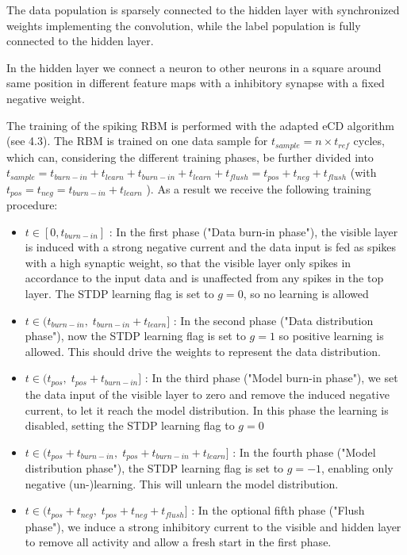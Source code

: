 The data population is sparsely connected to the hidden layer with synchronized weights implementing the convolution, while the label population is fully connected to the hidden layer.

In the hidden layer we connect a neuron to other neurons in a square around same position in different feature maps with a inhibitory synapse with a fixed negative weight.

The training of the spiking RBM is performed with the adapted eCD algorithm (see 4.3).
The RBM is trained on one data sample for $t_{sample} = n \times t_{ref}$ cycles, which can, considering the different training phases, be further divided into $t_{sample} = t_{burn-in} + t_{learn} + t_{burn-in} + t_{learn} + t_{flush} = t_{pos} + t_{neg} + t_{flush}$ (with $t_{pos} = t_{neg} = t_{burn-in} + t_{learn}$ ). 
As a result we receive the following training procedure:
\begin{itemize}

\item $t \in [0, t_{burn-in}]$ : In the first phase ("Data burn-in phase"), the visible layer is induced with a strong negative current and the data input is fed as spikes with a high synaptic weight, so that the visible layer only spikes in accordance to the input data and is unaffected from any spikes in the top layer.
The STDP learning flag is set to $g=0$, so no learning is allowed

\item $t \in (t_{burn-in} , \; t_{burn-in} + t_{learn}]$ : In the second phase ("Data distribution phase"), now the STDP learning flag is set to $g=1$ so positive learning is allowed.
This should drive the weights to represent the data distribution.

\item $t \in (t_{pos}, \;  t_{pos} + t_{burn-in}]$ : In the third phase ("Model burn-in phase"), we set the data input of the visible layer to zero and remove the induced negative current, to let it reach the model distribution.
In this phase the learning is disabled, setting the STDP learning flag to $g=0$

\item $t \in (t_{pos} + t_{burn-in}, \;  t_{pos} + t_{burn-in} + t_{learn}]$ : In the fourth phase ("Model distribution phase"), the STDP learning flag is set to $g=-1$, enabling only negative (un-)learning.
This will unlearn the model distribution.

\item $t \in (t_{pos} + t_{neg}, \;  t_{pos} + t_{neg} + t_{flush}]$ : In the optional fifth phase ("Flush phase"), we induce a strong inhibitory current to the visible and hidden layer to remove all activity and allow a fresh start in the first phase.

\end{itemize}



